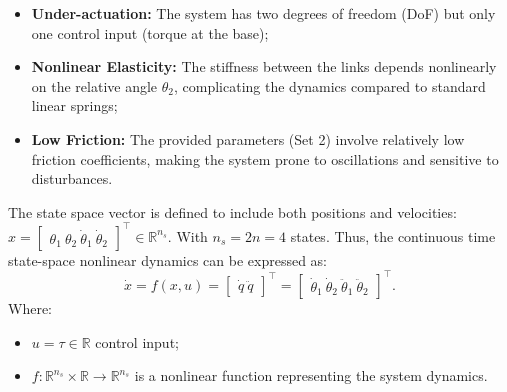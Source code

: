 \begin{itemize}
    \item \textbf{Under-actuation:} The system has two degrees of freedom (DoF) but only one control input (torque at the base);
    \item \textbf{Nonlinear Elasticity:} The stiffness between the links depends nonlinearly on the relative angle $\theta_2$, complicating the dynamics compared to standard linear springs;
    \item \textbf{Low Friction:} The provided parameters (Set 2) involve relatively low friction coefficients, making the system prone to oscillations and sensitive to disturbances.
\end{itemize}

The state space vector is defined to include both positions and velocities: $x = \begin{bmatrix} \theta_1 \ \theta_2 \ \dot{\theta}_1 \ \dot{\theta}_2 \end{bmatrix}^\top \in \mathbb{R}^{n_s}$. With $n_s = 2n = 4$ states. Thus, the continuous time state-space nonlinear dynamics can be expressed as:
\begin{equation}
      \dot{x} = f(x, u) = \begin{bmatrix} \dot{q} \ \ddot{q} \end{bmatrix}^\top = \begin{bmatrix} \dot{\theta}_1 \ \dot{\theta}_2 \ \ddot{\theta}_1 \ \ddot{\theta}_2 \end{bmatrix}^\top.
      \label{eq:nonlinear_dynamics}
\end{equation}
Where:
\begin{itemize}
      \item $u = \tau \in \mathbb{R}$ control input;
      \item $f: \mathbb{R}^{n_s} \times \mathbb{R} \rightarrow \mathbb{R}^{n_s}$ is a nonlinear function representing the system dynamics.
\end{itemize}

